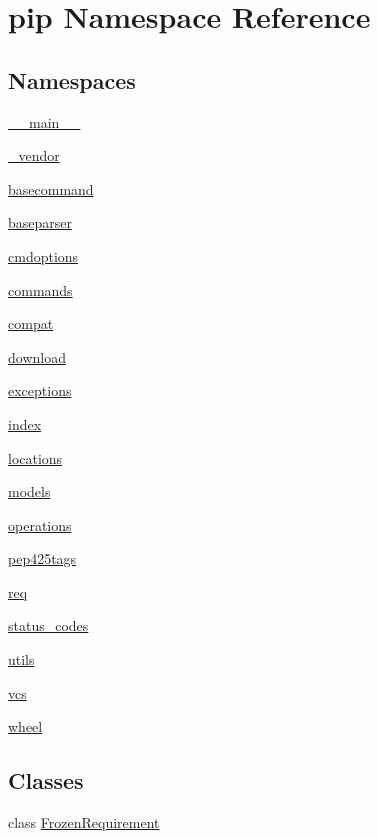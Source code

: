 \hypertarget{namespacepip}{}\section{pip Namespace Reference}
\label{namespacepip}
\subsection*{Namespaces}
\begin{DoxyCompactItemize}
\item 
 \hyperlink{namespacepip_1_1____main____}{\+\_\+\+\_\+main\+\_\+\+\_\+}
\item 
 \hyperlink{namespacepip_1_1__vendor}{\+\_\+vendor}
\item 
 \hyperlink{namespacepip_1_1basecommand}{basecommand}
\item 
 \hyperlink{namespacepip_1_1baseparser}{baseparser}
\item 
 \hyperlink{namespacepip_1_1cmdoptions}{cmdoptions}
\item 
 \hyperlink{namespacepip_1_1commands}{commands}
\item 
 \hyperlink{namespacepip_1_1compat}{compat}
\item 
 \hyperlink{namespacepip_1_1download}{download}
\item 
 \hyperlink{namespacepip_1_1exceptions}{exceptions}
\item 
 \hyperlink{namespacepip_1_1index}{index}
\item 
 \hyperlink{namespacepip_1_1locations}{locations}
\item 
 \hyperlink{namespacepip_1_1models}{models}
\item 
 \hyperlink{namespacepip_1_1operations}{operations}
\item 
 \hyperlink{namespacepip_1_1pep425tags}{pep425tags}
\item 
 \hyperlink{namespacepip_1_1req}{req}
\item 
 \hyperlink{namespacepip_1_1status__codes}{status\+\_\+codes}
\item 
 \hyperlink{namespacepip_1_1utils}{utils}
\item 
 \hyperlink{namespacepip_1_1vcs}{vcs}
\item 
 \hyperlink{namespacepip_1_1wheel}{wheel}
\end{DoxyCompactItemize}
\subsection*{Classes}
\begin{DoxyCompactItemize}
\item 
class \hyperlink{classpip_1_1_frozen_requirement}{Frozen\+Requirement}
\end{DoxyCompactItemize}
